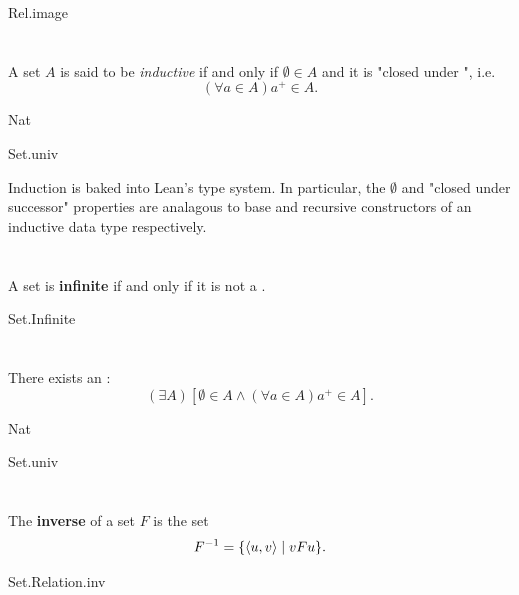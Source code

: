 \documentclass{report}
\begin{document}
    {Rel.image}

\section{}%

  A set $A$ is said to be \textit{inductive} if and only if $\emptyset \in A$
    and it is "closed under ", i.e.
    $$(\forall a \in A) a^+ \in A.$$

    {Nat}

    {Set.univ}

  \begin{note}
    Induction is baked into Lean's type system.
    In particular, the $\emptyset$ and "closed under successor" properties are
      analagous to base and recursive constructors of an inductive data type
      respectively.
  \end{note}

\section{}%

  A set is \textbf{infinite} if and only if it is not a
    .

    {Set.Infinite}

\section{}%

  There exists an :
    $$(\exists A)\left[
      \emptyset \in A \land (\forall a \in A) a^+ \in A\right].$$

    {Nat}

    {Set.univ}

\section{}%

  The \textbf{inverse} of a set $F$ is the set
    $$F^{-1} = \{\left< u, v \right> \mid vFu\}.$$

    {Set.Relation.inv}
\end{document}
